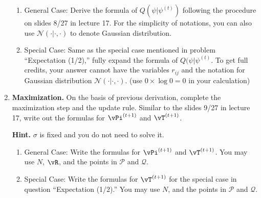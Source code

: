 \begin{Q}
\begin{enumerate}
\begin{enumerate}
    \item General Case: Derive the formula of $Q(\psi|\psi^{(t)})$ following the procedure on slides 8/27 in lecture 17. For the simplicity of notations, you can also use $\mathcal{N}(\cdot|\cdot, \cdot)$ to denote Gaussian distribution.
    
    \item Special Case: Same as the special case mentioned in problem ``Expectation (1/2),'' fully expand the formula of $Q(\psi|\psi^{(t)}$. To get full credits, your answer cannot have the variables $r_{ij}$ and the notation for Gaussian distribution $\mathcal{N}(\cdot|\cdot, \cdot)$. (use $0 \times \log 0 =0 $ in your calculation)

\end{enumerate}

\item \textbf{Maximization.} On the basis of previous derivation, complete the maximization step and the update rule. Similar to the slides 9/27 in lecture 17, write out the formulas for $\vPi^{(t+1)}$ and $\vT^{(t+1)}$.

\textbf{Hint.} $\sigma$ is fixed and you do not need to solve it.

\begin{enumerate}
\item General Case: Write the formulas for $\vPi^{(t+1)}$ and $\vT^{(t+1)}$. You may use $N$, $\vR$, and the points in $\mathcal{P}$ and $\mathcal{Q}$.

\item Special Case: Write the formulas for $\vT^{(t+1)}$ for the special case in question ``Expectation (1/2).'' You may use $N$, and the points in $\mathcal{P}$ and $\mathcal{Q}$.

\end{enumerate}

\end{enumerate}
\end{Q}
          